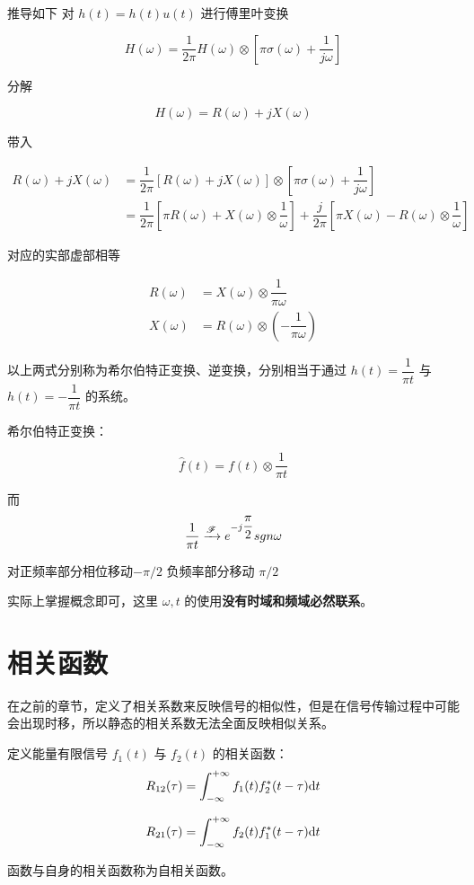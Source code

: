 \documentclass[cn,11pt,chinese,black,simple]{../elegantbook}
\begin{document}
推导如下 对 \(h(t) = h(t) u(t)\) 进行傅里叶变换

\[ H(\omega) = \dfrac{1}{2 \pi} H(\omega) \otimes \left[\pi \sigma(\omega) + \dfrac{1}{j \omega}\right] \]

分解

\[H(\omega) = R(\omega) + j X(\omega)\]

带入

\begin{equation*}
    \begin{aligned}
        R(\omega) + j X(\omega) &= \dfrac{1}{2 \pi} \left[R(\omega) + j X(\omega) \right] \otimes \left[\pi \sigma(\omega) + \dfrac{1}{j \omega} \right] \\
        &= \dfrac{1}{2\pi}\left[\pi R(\omega) + X(\omega)\otimes \dfrac{1}{\omega}\right] + \dfrac{j}{2 \pi} \left[\pi X(\omega) - R(\omega) \otimes \dfrac{1}{\omega}\right]
    \end{aligned}
\end{equation*}

对应的实部虚部相等

\begin{equation*}
    \begin{aligned}
        R(\omega) &= X(\omega) \otimes \dfrac{1}{\pi \omega}\\
        X(\omega) &= R(\omega) \otimes (- \dfrac{1}{\pi \omega})
    \end{aligned}
\end{equation*}

以上两式分别称为希尔伯特正变换、逆变换，分别相当于通过 \(h(t) = \dfrac{1}{\pi t}\) 与 \(h(t) = -\dfrac{1}{\pi t}\) 的系统。

希尔伯特正变换：

\[\hat{f}(t) = f(t) \otimes \dfrac{1}{\pi t}\]

而 \[\dfrac{1}{\pi t} \xrightarrow{\mathscr{F}} e^{-j\dfrac{\pi}{2}} sgn \omega \]

对正频率部分相位移动\(-\pi/2\) 负频率部分移动 \(\pi / 2\)

实际上掌握概念即可，这里 \(\omega, t\) 的使用\textbf{没有时域和频域必然联系}。


\section{相关函数}

在之前的章节，定义了相关系数来反映信号的相似性，但是在信号传输过程中可能会出现时移，所以静态的相关系数无法全面反映相似关系。

\begin{definition}[相关函数(能量)]
    定义能量有限信号 \(f_1(t)\) 与 \(f_2(t)\) 的相关函数：
    \[R_{12}(\tau) = \int_{-\infty}^{+\infty} f_1(t) f_2^*(t-\tau) \mathrm{d}t\]

    \[R_{21}(\tau) = \int_{-\infty}^{+\infty} f_2(t) f_1^*(t-\tau) \mathrm{d}t\]
    
    函数与自身的相关函数称为自相关函数。
\end{definition}
\end{document}
